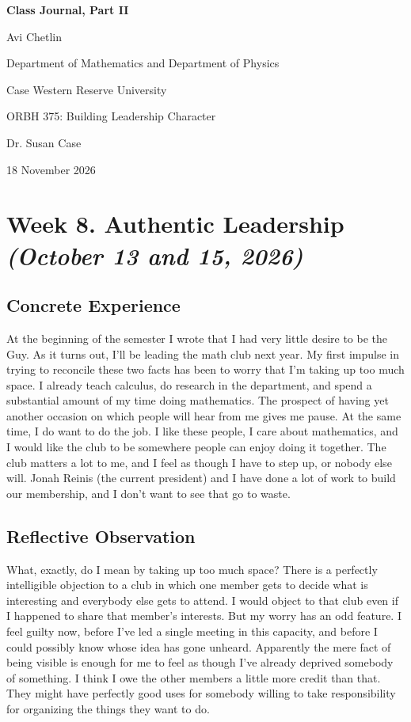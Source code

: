 \documentclass[12pt,letterpaper]{article}
\newcommand{\entry}[1]{\clearpage\section{#1}}
\begin{document}
\begin{titlepage}\centering\vspace*{2in}
{\Large\bfseries Class Journal, Part II\par}
Avi Chetlin\par Department of Mathematics and Department of Physics\par Case Western Reserve University\par
ORBH 375: Building Leadership Character\par Dr. Susan Case\par
18 November 2026\end{titlepage}
\tableofcontents
\entry{Week 8. Authentic Leadership \textit{(October 13 and 15, 2026)}}
\subsection{Concrete Experience}
At the beginning of the semester I wrote that I had very little desire to be the Guy. As it turns out, I'll be leading the math club next year. My first impulse in trying to reconcile these two facts has been to worry that I'm taking up too much space. I already teach calculus, do research in the department, and spend a substantial amount of my time doing mathematics. The prospect of having yet another occasion on which people will hear from me gives me pause. At the same time, I do want to do the job. I like these people, I care about mathematics, and I would like the club to be somewhere people can enjoy doing it together.
The club matters a lot to me, and I feel as though I have to step up, or nobody else will.
Jonah Reinis (the current president) and I have done a lot of work to build our membership, and I don't want to see that go to waste.

\subsection{Reflective Observation}
What, exactly, do I mean by taking up too much space? There is a perfectly intelligible objection to a club in which one member gets to decide what is interesting and everybody else gets to attend. I would object to that club even if I happened to share that member's interests. But my worry has an odd feature. I feel guilty now, before I've led a single meeting in this capacity, and before I could possibly know whose idea has gone unheard. Apparently the mere fact of being visible is enough for me to feel as though I've already deprived somebody of something. I think I owe the other members a little more credit than that. They might have perfectly good uses for somebody willing to take responsibility for organizing the things they want to do.
\end{document}
